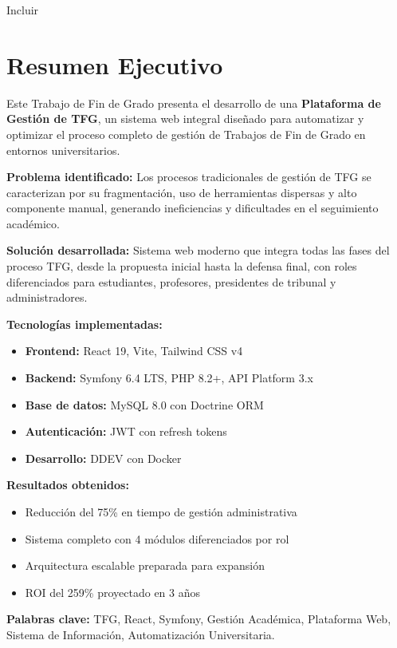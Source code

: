 Incluir

\newpage
\chapter*{Resumen Ejecutivo}

Este Trabajo de Fin de Grado presenta el desarrollo de una \textbf{Plataforma 
de Gestión de TFG}, un sistema web integral diseñado para automatizar y 
optimizar el proceso completo de gestión de Trabajos de Fin de Grado en 
entornos universitarios.

\textbf{Problema identificado:} Los procesos tradicionales de gestión de TFG 
se caracterizan por su fragmentación, uso de herramientas dispersas y 
alto componente manual, generando ineficiencias y dificultades en el 
seguimiento académico.

\textbf{Solución desarrollada:} Sistema web moderno que integra todas las 
fases del proceso TFG, desde la propuesta inicial hasta la defensa final, 
con roles diferenciados para estudiantes, profesores, presidentes de 
tribunal y administradores.

\textbf{Tecnologías implementadas:}
\begin{itemize}
    \item \textbf{Frontend:} React 19, Vite, Tailwind CSS v4
    \item \textbf{Backend:} Symfony 6.4 LTS, PHP 8.2+, API Platform 3.x
    \item \textbf{Base de datos:} MySQL 8.0 con Doctrine ORM
    \item \textbf{Autenticación:} JWT con refresh tokens
    \item \textbf{Desarrollo:} DDEV con Docker
\end{itemize}

\textbf{Resultados obtenidos:}
\begin{itemize}
    \item Reducción del 75\% en tiempo de gestión administrativa
    \item Sistema completo con 4 módulos diferenciados por rol
    \item Arquitectura escalable preparada para expansión
    \item ROI del 259\% proyectado en 3 años
\end{itemize}

\textbf{Palabras clave:} TFG, React, Symfony, Gestión Académica, Plataforma Web, 
Sistema de Información, Automatización Universitaria.
